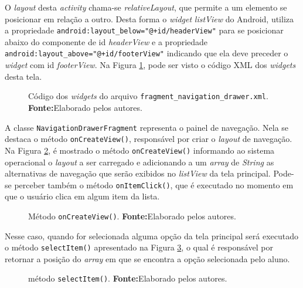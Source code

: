 	\par O \textit{layout} desta \textit{activity} chama-se
\textit{relativeLayout}, que permite a um elemento  se posicionar em
relação a outro. Desta forma o \textit{widget} \textit{listView}
do Android, utiliza a propriedade
\texttt{android:layout\_below="@+id/headerView"} para se posicionar abaixo do
componente de id \textit{headerView} e a propriedade
\texttt{android:layout\_above="@+id/footerView"} indicando que ela deve
preceder o \textit{widget} com id \textit{footerView}. Na Figura
\ref{fig:app2}, pode ser visto o código XML dos \textit{widgets} desta tela.

	\begin{figure}[h!] 
		
		\caption[Código dos widgets do arquivo
		fragment\_navigation\_drawer.xml]{Código dos \textit{widgets} do arquivo
		\texttt{fragment\_navigation\_drawer.xml}.
		\textbf{Fonte:}Elaborado pelos autores.}
		\label{fig:app2}
	\end{figure}
	
	\pagebreak
	
	\par A classe \texttt{NavigationDrawerFragment} representa o painel de
navegação. Nela se destaca o método \texttt{onCreateView()}, responsável por
criar o \textit{layout} de navegação. Na Figura \ref{fig:app3}, é mostrado o
método \texttt{onCreateView()} informando ao sistema operacional o \textit{layout} a
ser carregado e adicionando a um \textit{array} de \textit{String} as
alternativas de navegação que serão exibidos no \textit{listView} da tela
principal. Pode-se perceber também o método \texttt{onItemClick()}, que é
executado no momento em que o usuário clica em algum item da lista. 
	


	\begin{figure}[h!] 
		
		\caption[Método onCreateView()]{Método \texttt{onCreateView()}.
		\textbf{Fonte:}Elaborado pelos autores.}
		\label{fig:app3}
	\end{figure}
	
	\pagebreak
	
	\par Nesse caso, quando for selecionada alguma opção da tela principal será
executado o método \texttt{selectItem()} apresentado na Figura \ref{fig:app4}, o
qual é responsável por retornar a posição do \textit{array} em que se encontra a
opção selecionada pelo aluno.
	
	\begin{figure}[h!] 
		
		\caption[método selectItem()]{método \texttt{selectItem()}.
		\textbf{Fonte:}Elaborado pelos autores.}
		\label{fig:app4}
	\end{figure}
	
